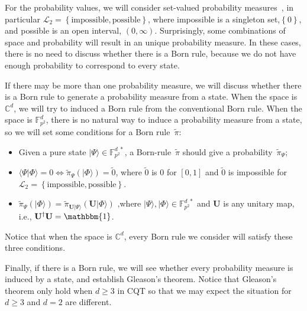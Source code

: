 \documentclass{article}
\theoremstyle{remark}
\newcommand{\ket}[1]{|#1\rangle}
\newcommand{\ip}[2]{\langle #1 | #2 \rangle}
\newcommand{\ffzd}[1]{{\mathbb{F}^{d\;*}_{#1}}}
\begin{document}
For the probability values, we will consider set-valued probability
measures~\cite{Artstein1972,PuriRalescu1983}, in particular $\mathscr{L}_{2}=\left\{ \textrm{impossible},\textrm{possible}\right\} $,
where impossible is a singleton set,$\left\{ 0\right\} $, and possible
is an open interval, $\left(0,\infty\right)$. Surprisingly, some
combinations of space and probability will result in an unique probability
measure. In these cases, there is no need to discuss whether there
is a Born rule, because we do not have enough probability to correspond
to every state.

If there may be more than one probability measure, we will discuss
whether there is a Born rule to generate a probability measure from
a state. When the space is $\mathbb{C}^{d}$, we will try to induced
a Born rule from the conventional Born rule. When the space is $\mathbb{F}_{p^{2}}^{d}$,
there is no natural way to induce a probability measure from a state,
so we will set some conditions for a Born rule~$\tilde{\pi}$: 
\begin{itemize}
\item Given a pure state $\ket{\Psi}\in\ffzd{p^{2}}$, a Born-rule~$\tilde{\pi}$
should give a probability~$\tilde{\pi}_{\Psi}$; 
\item $\ip{\Psi}{\Phi}=0\Leftrightarrow\tilde{\pi}_{\Psi}\left(\ket{\Phi}\right)=\tilde{0}$,
where $\tilde{0}$ is $0$ for $\left[0,1\right]$ and $\tilde{0}$
is impossible for $\mathscr{L}_{2}=\left\{ \textrm{impossible},\textrm{possible}\right\} $. 
\item $\tilde{\pi}_{\Psi}\left(\ket{\Phi}\right)=\tilde{\pi}_{\mathbf{U}\ket{\Psi}}\left(\mathbf{U}\ket{\Phi}\right)\textrm{ ,}$where
$\ket{\Psi},\ket{\Phi}\in\ffzd{p^{2}}$ and $\mathbf{U}$ is any unitary
map, i.e., $\mathbf{U}^{\dagger}\mathbf{U}=\mathbbm{1}$. 
\end{itemize}
Notice that when the space is $\mathbb{C}^{d}$, every Born rule we
consider will satisfy these three conditions.

Finally, if there is a Born rule, we will see whether every probability
measure is induced by a state, and establish Gleason's theorem. Notice
that Gleason's theorem only hold when $d\ge3$ in CQT so that we may
expect the situation for $d\ge3$ and $d=2$ are different. 
\end{document}
